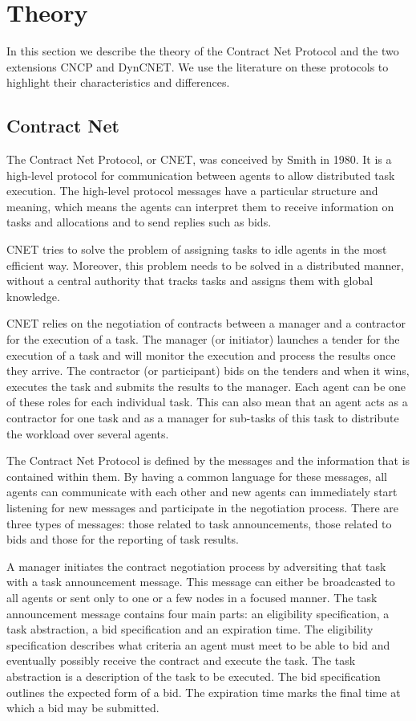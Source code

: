 \documentclass[10pt,a4paper]{article}
\begin{document}
\section{Theory}

In this section we describe the theory of the Contract Net Protocol and the two extensions CNCP and DynCNET. We use the literature on these protocols to highlight their characteristics and differences.

\subsection{Contract Net} The Contract Net Protocol, or CNET, was conceived by Smith in 1980. \cite{CNET} It is a high-level protocol for communication between agents to allow distributed task execution. The high-level protocol messages have a particular structure and meaning, which means the agents can interpret them to receive information on tasks and allocations and to send replies such as bids. 

CNET tries to solve the problem of assigning tasks to idle agents in the most efficient way. Moreover, this problem needs to be solved in a distributed manner, without a central authority that tracks tasks and assigns them with global knowledge.

CNET relies on the negotiation of contracts between a manager and a contractor for the execution of a task. The manager (or initiator) launches a tender for the execution of a task and will monitor the execution and process the results once they arrive. The contractor (or participant) bids on the tenders and when it wins, executes the task and submits the results to the manager. Each agent can be one of these roles for each individual task. This can also mean that an agent acts as a contractor for one task and as a manager for sub-tasks of this task to distribute the workload over several agents.

The Contract Net Protocol is defined by the messages and the information that is contained within them. By having a common language for these messages, all agents can communicate with each other and new agents can immediately start listening for new messages and participate in the negotiation process. There are three types of messages: those related to task announcements, those related to bids and those for the reporting of task results.

A manager initiates the contract negotiation process by adversiting that task with a task announcement message. This message can either be broadcasted to all agents or sent only to one or a few nodes in a focused manner. The task announcement message contains four main parts: an eligibility specification, a task abstraction, a bid specification and an expiration time. The eligibility specification describes what criteria an agent must meet to be able to bid and eventually possibly receive the contract and execute the task. The task abstraction is a description of the task to be executed. The bid specification outlines the expected form of a bid. The expiration time marks the final time at which a bid may be submitted.
\end{document}
